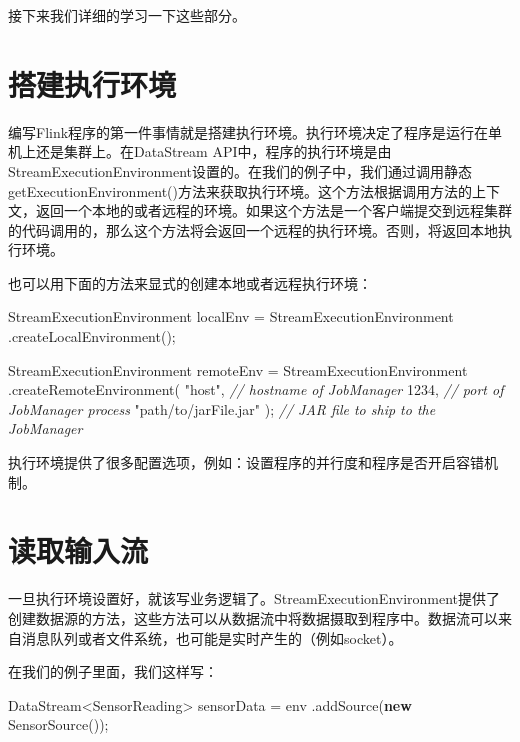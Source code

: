 \documentclass[cn,11pt,chinese]{elegantbook}
\newenvironment{Shaded}{}{}
\newcommand{\CommentTok}[1]{\textcolor[rgb]{0.38,0.63,0.69}{\textit{#1}}}
\newcommand{\DecValTok}[1]{\textcolor[rgb]{0.25,0.63,0.44}{#1}}
\newcommand{\FunctionTok}[1]{\textcolor[rgb]{0.02,0.16,0.49}{#1}}
\newcommand{\KeywordTok}[1]{\textcolor[rgb]{0.00,0.44,0.13}{\textbf{#1}}}
\newcommand{\NormalTok}[1]{#1}
\newcommand{\StringTok}[1]{\textcolor[rgb]{0.25,0.44,0.63}{#1}}
\begin{document}
接下来我们详细的学习一下这些部分。

\hypertarget{ux642dux5efaux6267ux884cux73afux5883}{%
\section{搭建执行环境}\label{ux642dux5efaux6267ux884cux73afux5883}}

编写Flink程序的第一件事情就是搭建执行环境。执行环境决定了程序是运行在单机上还是集群上。在DataStream
API中，程序的执行环境是由StreamExecutionEnvironment设置的。在我们的例子中，我们通过调用静态getExecutionEnvironment()方法来获取执行环境。这个方法根据调用方法的上下文，返回一个本地的或者远程的环境。如果这个方法是一个客户端提交到远程集群的代码调用的，那么这个方法将会返回一个远程的执行环境。否则，将返回本地执行环境。

也可以用下面的方法来显式的创建本地或者远程执行环境：

\begin{Shaded}
\begin{Highlighting}[]
\NormalTok{StreamExecutionEnvironment localEnv = StreamExecutionEnvironment}
\NormalTok{  .}\FunctionTok{createLocalEnvironment}\NormalTok{();}

\NormalTok{StreamExecutionEnvironment remoteEnv = StreamExecutionEnvironment}
\NormalTok{  .}\FunctionTok{createRemoteEnvironment}\NormalTok{(}
    \StringTok{"host"}\NormalTok{, }\CommentTok{// hostname of JobManager}
    \DecValTok{1234}\NormalTok{, }\CommentTok{// port of JobManager process}
    \StringTok{"path/to/jarFile.jar"}
\NormalTok{  ); }\CommentTok{// JAR file to ship to the JobManager}
\end{Highlighting}
\end{Shaded}

执行环境提供了很多配置选项，例如：设置程序的并行度和程序是否开启容错机制。

\hypertarget{ux8bfbux53d6ux8f93ux5165ux6d41}{%
\section{读取输入流}\label{ux8bfbux53d6ux8f93ux5165ux6d41}}

一旦执行环境设置好，就该写业务逻辑了。StreamExecutionEnvironment提供了创建数据源的方法，这些方法可以从数据流中将数据摄取到程序中。数据流可以来自消息队列或者文件系统，也可能是实时产生的（例如socket）。

在我们的例子里面，我们这样写：

\begin{Shaded}
\begin{Highlighting}[]
\NormalTok{DataStream\textless{}SensorReading\textgreater{} sensorData = env}
\NormalTok{  .}\FunctionTok{addSource}\NormalTok{(}\KeywordTok{new} \FunctionTok{SensorSource}\NormalTok{());}
\end{Highlighting}
\end{Shaded}
\end{document}

